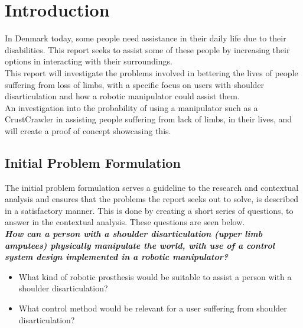 \chapter{Introduction}\label{ch:Introduction}
In Denmark today, some people need assistance in their daily life due to their disabilities. This report seeks to assist some of these people by increasing their options in interacting with their surroundings.\\

This report will investigate the problems involved in bettering the lives of people suffering from loss of limbs, with a specific focus on users with shoulder disarticulation and how a robotic manipulator could assist them.\\

An investigation into the probability of using a manipulator such as a CrustCrawler in assisting people suffering from lack of limbs, in their lives, and will create a proof of concept showcasing this.

\section{Initial Problem Formulation}
The initial problem formulation serves a guideline to the research and contextual analysis and ensures that the problems the report seeks out to solve, is described in a satisfactory manner. This is done by creating a short series of questions, to answer in the contextual analysis. These questions are seen below.\\ 
\noindent \textbf{\textit{How can a person with a shoulder disarticulation (upper limb amputees) physically manipulate the world, with use of a control system design implemented in a robotic manipulator?}}
\begin{itemize}
    \item What kind of robotic prosthesis would be suitable to assist a person with a shoulder disarticulation?
    \item What control method would be relevant for a user suffering from shoulder disarticulation?
\end{itemize}
